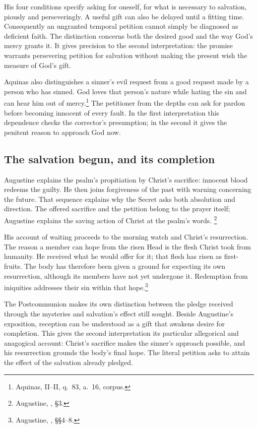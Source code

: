 His four conditions specify asking for oneself, for what is necessary
to salvation, piously and perseveringly. A useful gift can also be
delayed until a fitting time. Consequently an ungranted temporal
petition cannot simply be diagnosed as deficient faith. The distinction
concerns both the desired good and the way God's mercy grants it.
It gives precision to the second interpretation: the promise warrants
persevering petition for salvation without making the present wish
the measure of God's gift.

Aquinas also distinguishes a sinner's evil request from a good
request made by a person who has sinned. God loves that person's
nature while hating the sin and can hear him out of mercy.\footnote{Aquinas,
 II--II, q.~83, a.~16, corpus.}
The petitioner from the depths can ask for pardon before becoming
innocent of every fault. In the first interpretation this dependence
checks the corrector's presumption; in the second it gives the
penitent reason to approach God now.

\subsection{The salvation begun, and its completion}
Augustine explains the psalm's propitiation by Christ's sacrifice:
innocent blood redeems the guilty. He then joins forgiveness of the
past with warning concerning the future. That sequence explains
why the Secret asks both absolution and direction. The offered
sacrifice and the petition belong to the prayer itself; Augustine
explains the saving action of Christ at the psalm's words.
\footnote{Augustine, , §3.}

His account of waiting proceeds to the morning watch and Christ's
resurrection. The reason a member can hope from the risen Head
is the flesh Christ took from humanity. He received what he would
offer for it; that flesh has risen as first-fruits. The body has
therefore been given a ground for expecting its own resurrection,
although its members have not yet undergone it. Redemption from
iniquities addresses their sin within that hope.\footnote{Augustine,
, §§4--8.}

The Postcommunion makes its own distinction between the pledge
received through the mysteries and salvation's effect still sought.
Beside Augustine's exposition, reception can be understood as a
gift that awakens desire for completion. This gives the second
interpretation its particular allegorical and anagogical account:
Christ's sacrifice makes the sinner's approach possible, and his
resurrection grounds the body's final hope. The literal petition
asks to attain the effect of the salvation already pledged.


